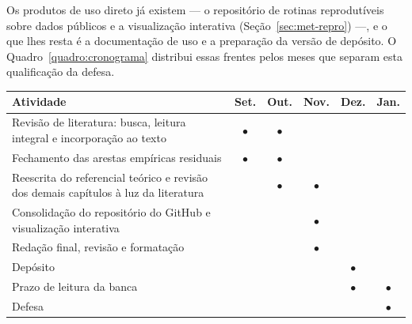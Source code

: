 Os produtos de uso direto já existem --- o repositório de rotinas
reprodutíveis sobre dados públicos e a visualização interativa
(Seção~\ref{sec:met-repro}) ---, e o que lhes resta é a documentação de uso e
a preparação da versão de depósito. O Quadro~\ref{quadro:cronograma} distribui
essas frentes pelos meses que separam esta qualificação da defesa.


\begin{quadro}[htb]
\centering
\caption[Cronograma de atividades até a defesa]{Cronograma de atividades até a defesa.}
\label{quadro:cronograma}
\small
\begin{tabular}{p{5.6cm}ccccc}
\toprule
\textbf{Atividade} & \textbf{Set.} & \textbf{Out.} & \textbf{Nov.} &
\textbf{Dez.} & \textbf{Jan.} \\
\midrule
Revisão de literatura: busca, leitura integral e incorporação ao texto &
$\bullet$ & $\bullet$ & & & \\
\addlinespace
Fechamento das arestas empíricas residuais &
$\bullet$ & $\bullet$ & & & \\
\addlinespace
Reescrita do referencial teórico e revisão dos demais capítulos à luz da
literatura &
& $\bullet$ & $\bullet$ & & \\
\addlinespace
Consolidação do repositório do GitHub e visualização interativa &
& & $\bullet$ & & \\
\addlinespace
Redação final, revisão e formatação &
& & $\bullet$ & & \\
\addlinespace
Depósito &
& & & $\bullet$ & \\
\addlinespace
Prazo de leitura da banca &
& & & $\bullet$ & $\bullet$ \\
\addlinespace
Defesa &
& & & & $\bullet$ \\
\bottomrule
\end{tabular}
\end{quadro}

